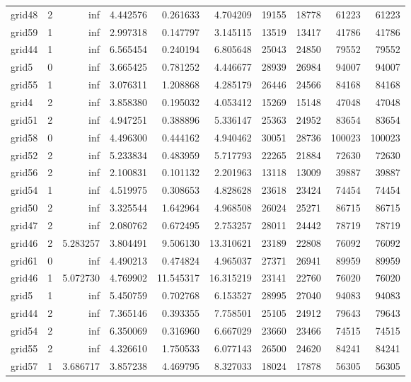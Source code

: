 \begin{longtable}{|l|r|r|r|r|r|r|r|r|r|}
grid48 & 2 & inf & 4.442576 & 0.261633 & 4.704209 & 19155 & 18778 & 61223 & 61223 \\
grid59 & 1 & inf & 2.997318 & 0.147797 & 3.145115 & 13519 & 13417 & 41786 & 41786 \\
grid44 & 1 & inf & 6.565454 & 0.240194 & 6.805648 & 25043 & 24850 & 79552 & 79552 \\
grid5 & 0 & inf & 3.665425 & 0.781252 & 4.446677 & 28939 & 26984 & 94007 & 94007 \\
grid55 & 1 & inf & 3.076311 & 1.208868 & 4.285179 & 26446 & 24566 & 84168 & 84168 \\
grid4 & 2 & inf & 3.858380 & 0.195032 & 4.053412 & 15269 & 15148 & 47048 & 47048 \\
grid51 & 2 & inf & 4.947251 & 0.388896 & 5.336147 & 25363 & 24952 & 83654 & 83654 \\
grid58 & 0 & inf & 4.496300 & 0.444162 & 4.940462 & 30051 & 28736 & 100023 & 100023 \\
grid52 & 2 & inf & 5.233834 & 0.483959 & 5.717793 & 22265 & 21884 & 72630 & 72630 \\
grid56 & 2 & inf & 2.100831 & 0.101132 & 2.201963 & 13118 & 13009 & 39887 & 39887 \\
grid54 & 1 & inf & 4.519975 & 0.308653 & 4.828628 & 23618 & 23424 & 74454 & 74454 \\
grid50 & 2 & inf & 3.325544 & 1.642964 & 4.968508 & 26024 & 25271 & 86715 & 86715 \\
grid47 & 2 & inf & 2.080762 & 0.672495 & 2.753257 & 28011 & 24442 & 78719 & 78719 \\
grid46 & 2 & 5.283257 & 3.804491 & 9.506130 & 13.310621 & 23189 & 22808 & 76092 & 76092 \\
grid61 & 0 & inf & 4.490213 & 0.474824 & 4.965037 & 27371 & 26941 & 89959 & 89959 \\
grid46 & 1 & 5.072730 & 4.769902 & 11.545317 & 16.315219 & 23141 & 22760 & 76020 & 76020 \\
grid5 & 1 & inf & 5.450759 & 0.702768 & 6.153527 & 28995 & 27040 & 94083 & 94083 \\
grid44 & 2 & inf & 7.365146 & 0.393355 & 7.758501 & 25105 & 24912 & 79643 & 79643 \\
grid54 & 2 & inf & 6.350069 & 0.316960 & 6.667029 & 23660 & 23466 & 74515 & 74515 \\
grid55 & 2 & inf & 4.326610 & 1.750533 & 6.077143 & 26500 & 24620 & 84241 & 84241 \\
grid57 & 1 & 3.686717 & 3.857238 & 4.469795 & 8.327033 & 18024 & 17878 & 56305 & 56305 \\

\end{longtable}
